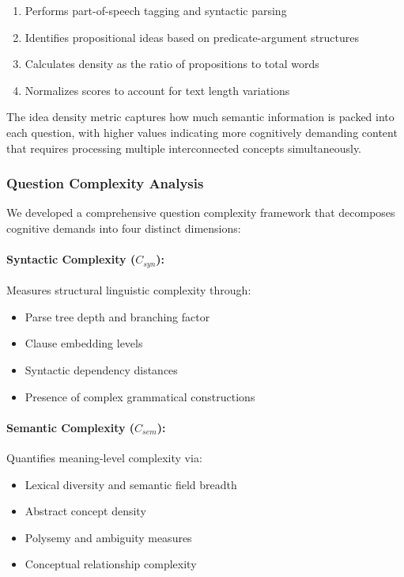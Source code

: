 \documentclass[12pt]{article}
\begin{document}
\begin{enumerate}
    \item Performs part-of-speech tagging and syntactic parsing
    \item Identifies propositional ideas based on predicate-argument structures
    \item Calculates density as the ratio of propositions to total words
    \item Normalizes scores to account for text length variations
\end{enumerate}

The idea density metric captures how much semantic information is packed into each question, with higher values indicating more cognitively demanding content that requires processing multiple interconnected concepts simultaneously.

\subsubsection{Question Complexity Analysis}

We developed a comprehensive question complexity framework that decomposes cognitive demands into four distinct dimensions:

\paragraph{Syntactic Complexity ($C_{syn}$):} Measures structural linguistic complexity through:
\begin{itemize}
    \item Parse tree depth and branching factor
    \item Clause embedding levels
    \item Syntactic dependency distances
    \item Presence of complex grammatical constructions
\end{itemize}

\paragraph{Semantic Complexity ($C_{sem}$):} Quantifies meaning-level complexity via:
\begin{itemize}
    \item Lexical diversity and semantic field breadth
    \item Abstract concept density
    \item Polysemy and ambiguity measures
    \item Conceptual relationship complexity
\end{itemize}
\end{document}
